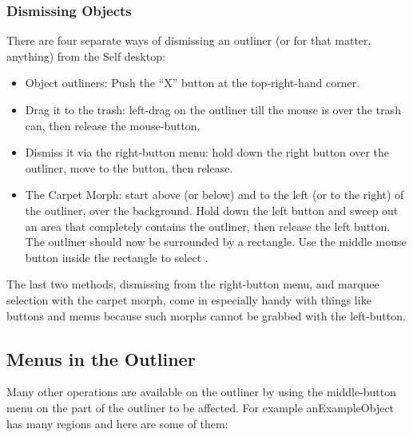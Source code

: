 \documentclass[letterpaper,10pt,english]{sphinxmanual}
\begin{document}
\subsubsection{Dismissing Objects}
\label{\detokenize{howtoprg:dismissing-objects}}
There are four separate ways of dismissing an outliner (or for that matter, anything) from the Self
desktop:
\begin{itemize}
\item {} 
Object outliners: Push the “X” button at the top-right-hand corner.

\item {} 
Drag it to the trash: left-drag on the outliner till the mouse is over the trash can,  then release the mouse-button.

\item {} 
Dismiss it via the right-button menu: hold down the right button over the outliner, move to the  button, then release.

\item {} 
The Carpet Morph: start above (or below) and to the left (or to the right) of the outliner, over the background. Hold down the left button and sweep out an area that completely contains the outliner, then release the left button. The outliner should now be surrounded by a rectangle. Use the middle mouse button inside the rectangle to select .

\end{itemize}

The last two methods, dismissing from the right-button menu, and marquee selection with the carpet
morph, come in especially handy with things like buttons and menus because such morphs cannot
be grabbed with the left-button.


\subsection{Menus in the Outliner}
\label{\detokenize{howtoprg:menus-in-the-outliner}}
Many other operations are available on the outliner by using the middle-button menu on the part of
the outliner to be affected. For example anExampleObject has many regions and here are some
of them:
\begin{figure}[htbp]
\centering

\noindent{}
\end{figure}
\end{document}
